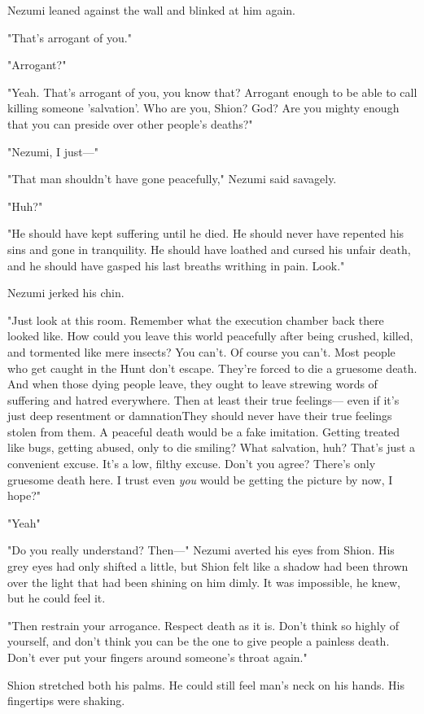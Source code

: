 Nezumi leaned against the wall and blinked at him again.

"That's arrogant of you."

"Arrogant?"

"Yeah. That's arrogant of you, you know that? Arrogant enough to be able
to call killing someone 'salvation'. Who are you, Shion? God? Are you
mighty enough that you can preside over other people's deaths?"

"Nezumi, I just---"

"That man shouldn't have gone peacefully," Nezumi said savagely.

"Huh?"

"He should have kept suffering until he died. He should never have
repented his sins and gone in tranquility. He should have loathed and
cursed his unfair death, and he should have gasped his last breaths
writhing in pain. Look."

Nezumi jerked his chin.

"Just look at this room. Remember what the execution chamber back there
looked like. How could you leave this world peacefully after being
crushed, killed, and tormented like mere insects? You can't. Of course
you can't. Most people who get caught in the Hunt don't escape. They're
forced to die a gruesome death. And when those dying people leave, they
ought to leave strewing words of suffering and hatred everywhere. Then
at least their true feelings--- even if it's just deep resentment or
damnation\el They should never have their true feelings stolen from
them. A peaceful death would be a fake imitation. Getting treated like
bugs, getting abused, only to die smiling? What salvation, huh? That's
just a convenient excuse. It's a low, filthy excuse. Don't you agree?
There's only gruesome death here. I trust even \emph{you} would be getting the
picture by now, I hope?"

"Yeah\el "

"Do you really understand? Then---" Nezumi averted his eyes from Shion.
His grey eyes had only shifted a little, but Shion felt like a shadow
had been thrown over the light that had been shining on him dimly. It
was impossible, he knew, but he could feel it.

"Then restrain your arrogance. Respect death as it is. Don't think so
highly of yourself, and don't think you can be the one to give people a
painless death. Don't ever put your fingers around someone's throat
again."

Shion stretched both his palms. He could still feel man's neck on his
hands. His fingertips were shaking.

